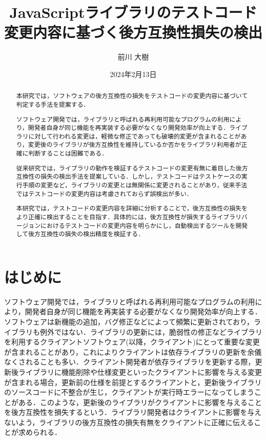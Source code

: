 \documentclass[11pt,dvipdfmx]{jreport}
\title{JavaScriptライブラリのテストコード変更内容に基づく後方互換性損失の検出}
\author{前川 大樹}
\date{2024年2月13日}	%
\begin{document}
\maketitle

\begin{abstract}
  本研究では，ソフトウェアの後方互換性の損失をテストコードの変更内容に基づいて判定する手法を提案する．

  ソフトウェア開発では，ライブラリと呼ばれる再利用可能なプログラムの利用により，開発者自身が同じ機能を再実装する必要がなくなり開発効率が向上する．ライブラリに対して行われる変更は，軽微な修正であっても破壊的変更が含まれることがあり，変更後のライブラリが後方互換性を維持しているか否かをライブラリ利用者が正確に判断することは困難である．

  従来研究では，ライブラリの動作を検証するテストコードの変更有無に着目した後方互換性の損失の検出手法を提案している．しかし，テストコードはテストケースの実行手順の変更など，ライブラリの変更とは無関係に変更されることがあり，従来手法ではテストコードの変更内容は考慮されておらず誤検出が多い．

  本研究では，テストコードの変更内容を詳細に分析することで，後方互換性の損失をより正確に検出することを目指す．具体的には，後方互換性が損失するライブラリバージョンにおけるテストコードの変更内容を明らかにし，自動検出するツールを開発して後方互換性の損失の検出精度を検証する．

\end{abstract}

\tableofcontents



\newpage
{}	%



\chapter{はじめに}
ソフトウェア開発では，ライブラリと呼ばれる再利用可能なプログラムの利用により，開発者自身が同じ機能を再実装する必要がなくなり開発効率が向上する\cite{shared-software}\cite{effect-on-developer}．ソフトウェアは新機能の追加，バグ修正などによって頻繁に更新されており，ライブラリも例外ではない\cite{library-analysis}．ライブラリの更新には，脆弱性の修正などライブラリを利用するクライアントソフトウェア(以降，クライアント)にとって重要な変更が含まれることがあり，これによりクライアントは依存ライブラリの更新を余儀なくされることも多い．クライアント開発者が依存ライブラリを更新する際，更新後ライブラリに機能削除や仕様変更といったクライアントに影響を与える変更が含まれる場合，更新前の仕様を前提とするクライアントと，更新後ライブラリのソースコードに不整合が生じ，クライアントが実行時エラーになってしまうことがある．このような，更新後のライブラリがクライアントに影響を与えることを後方互換性を損失するという．ライブラリ開発者はクライアントに影響を与えないよう，ライブラリの後方互換性の損失有無をクライアントに正確に伝えることが求められる．
\end{document}
